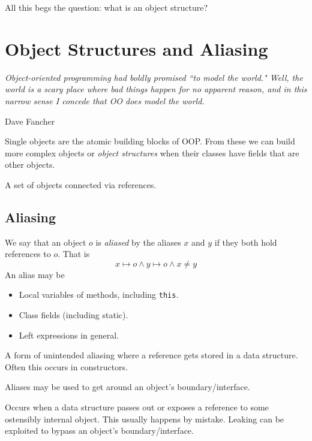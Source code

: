 \documentclass{article}
\begin{document}
All this begs the question: what is an object structure?

\section{Object Structures and Aliasing}

\epigraph{\itshape Object-oriented programming had boldly promised ``to model the world." Well, the world is a scary place where bad things happen for no apparent reason, and in this narrow sense I concede that OO does model the world.}{Dave Fancher}

Single objects are the atomic building blocks of OOP. From these we can build more complex objects or \textit{object structures} when their classes have fields that are other objects.

\begin{definition}
A set of objects connected via references.
\end{definition}

\subsection{Aliasing}

\begin{definition}[Aliasing]
We say that an object $o$ is \textit{aliased} by the aliases $x$ and $y$ if they both hold references to $o$.
That is
$$ x \mapsto o \wedge y \mapsto o \wedge x \neq y $$
An alias may be
\begin{itemize}
\item Local variables of methods, including \texttt{this}.
\item Class fields (including static).
\item Left expressions in general.
\end{itemize}
\end{definition}

\begin{definition}[Capturing]
A form of unintended aliasing where a reference gets stored in a data structure.
Often this occurs in constructors.
\end{definition}

Aliases may be used to get around an object's boundary/interface.

\begin{definition}[Leaking]
Occurs when a data structure passes out or exposes a reference to some ostensibly internal object.
This usually happens by mistake.
Leaking can be exploited to bypass an object's boundary/interface.
\end{definition}
\end{document}
